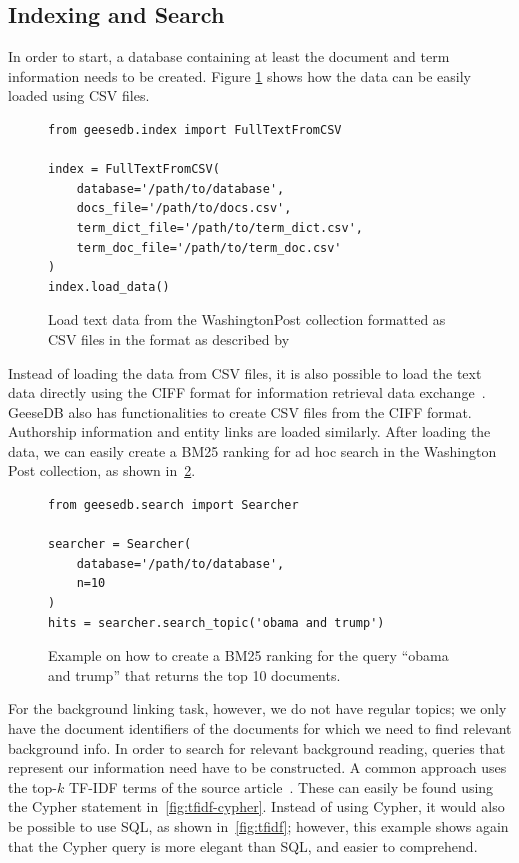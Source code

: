 \subsection{Indexing and Search}
In order to start, a database containing at least the document and term information needs to be created. Figure \ref{fig:load_text_data} shows how the data can be easily loaded using CSV files.
\begin{figure}
	\begin{verbatim}
from geesedb.index import FullTextFromCSV

index = FullTextFromCSV(
    database='/path/to/database',
    docs_file='/path/to/docs.csv',
    term_dict_file='/path/to/term_dict.csv',
    term_doc_file='/path/to/term_doc.csv'
)
index.load_data()
	\end{verbatim}
	\caption{Load text data from the WashingtonPost collection formatted as CSV files in the format as described by~\citet{OldDog}}
	\label{fig:load_text_data}
\end{figure}

Instead of loading the data from CSV files, it is also possible to load the text data directly using the CIFF format for information retrieval data exchange~\citep{ciff}. GeeseDB also has functionalities to create CSV files from the CIFF format. Authorship information and entity links are loaded similarly. After loading the data, we can easily create a BM25 ranking for ad hoc search in the Washington Post collection, as shown in~\cref{fig:code_bm25_ranking}.

\begin{figure}
	\begin{verbatim}
from geesedb.search import Searcher

searcher = Searcher(
    database='/path/to/database', 
    n=10
)
hits = searcher.search_topic('obama and trump')
	\end{verbatim}
	\caption{Example on how to create a BM25 ranking for the query ``obama and trump'' that returns the top 10 documents.}
	\label{fig:code_bm25_ranking}
\end{figure}

For the background linking task, however, we do not have regular topics; we only have the document identifiers of the documents for which we need to find relevant background info. In order to search for relevant background reading, queries that represent our information need have to be constructed. A common approach uses the top-$k$ TF-IDF terms of the source article~\citep{anserini-news}. These can easily be found using the Cypher statement in~\cref{fig:tfidf-cypher}. Instead of using Cypher, it would also be possible to use SQL, as shown in~\cref{fig:tfidf}; however, this example shows again that the Cypher query is more elegant than SQL, and easier to comprehend. 


